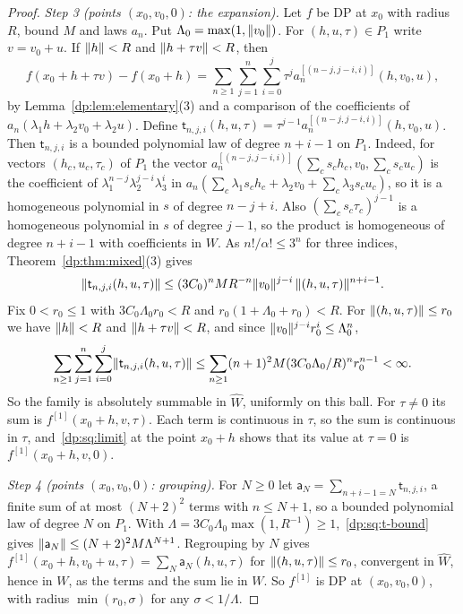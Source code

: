\begin{proof}
\emph{Step 3 (points $(x_0,v_0,0)$: the expansion).} Let $f$ be DP at $x_0$ with radius $R$, bound $M$ and laws $a_n$. Put $\Lambda_0=\max(1,\lVert v_0\rVert)$. For $(h,u,\tau)\in P_1$ write $v=v_0+u$. If $\lVert h\rVert<R$ and $\lVert h+\tau v\rVert<R$, then
\[
 f(x_0+h+\tau v)-f(x_0+h)=\sum_{n\ge1}\sum_{j=1}^n\sum_{i=0}^j\tau^ja_n^{[(n-j,j-i,i)]}(h,v_0,u),
\]
by Lemma~\ref{dp:lem:elementary}(3) and a comparison of the coefficients of $a_n(\lambda_1h+\lambda_2v_0+\lambda_2u)$. Define $\mathsf t_{n,j,i}(h,u,\tau)=\tau^{j-1}a_n^{[(n-j,j-i,i)]}(h,v_0,u)$. Then $\mathsf t_{n,j,i}$ is a bounded polynomial law of degree $n+i-1$ on $P_1$. Indeed, for vectors $(h_c,u_c,\tau_c)$ of $P_1$ the vector $a_n^{[(n-j,j-i,i)]}(\sum_cs_ch_c,v_0,\sum_cs_cu_c)$ is the coefficient of $\lambda_1^{n-j}\lambda_2^{j-i}\lambda_3^i$ in $a_n(\sum_c\lambda_1s_ch_c+\lambda_2v_0+\sum_c\lambda_3s_cu_c)$, so it is a homogeneous polynomial in $s$ of degree $n-j+i$. Also $(\sum_cs_c\tau_c)^{j-1}$ is a homogeneous polynomial in $s$ of degree $j-1$, so the product is homogeneous of degree $n+i-1$ with coefficients in $W$. As $n!/\alpha!\le3^n$ for three indices, Theorem~\ref{dp:thm:mixed}(3) gives
\begin{equation}\label{dp:sq:t-bound}
 \lVert \mathsf t_{n,j,i}(h,u,\tau)\rVert\le(3C_0)^nMR^{-n}\lVert v_0\rVert^{j-i}\,\lVert (h,u,\tau)\rVert^{n+i-1}.
\end{equation}
Fix $0<r_0\le1$ with $3C_0\Lambda_0r_0<R$ and $r_0(1+\Lambda_0+r_0)<R$. For $\lVert (h,u,\tau)\rVert\le r_0$ we have $\lVert h\rVert<R$ and $\lVert h+\tau v\rVert<R$, and since $\lVert v_0\rVert^{j-i}r_0^i\le\Lambda_0^n$,
\[
 \sum_{n\ge1}\sum_{j=1}^n\sum_{i=0}^j\lVert \mathsf t_{n,j,i}(h,u,\tau)\rVert\le\sum_{n\ge1}(n+1)^2M(3C_0\Lambda_0/R)^nr_0^{n-1}<\infty.
\]
So the family is absolutely summable in $\widehat W$, uniformly on this ball. For $\tau\ne0$ its sum is $f^{[1]}(x_0+h,v,\tau)$. Each term is continuous in $\tau$, so the sum is continuous in $\tau$, and~\eqref{dp:sq:limit} at the point $x_0+h$ shows that its value at $\tau=0$ is $f^{[1]}(x_0+h,v,0)$.

\emph{Step 4 (points $(x_0,v_0,0)$: grouping).} For $N\ge0$ let $\mathsf a_N=\sum_{n+i-1=N}\mathsf t_{n,j,i}$, a finite sum of at most $(N+2)^2$ terms with $n\le N+1$, so a bounded polynomial law of degree $N$ on $P_1$. With $\Lambda=3C_0\Lambda_0\max(1,R^{-1})\ge1$,~\eqref{dp:sq:t-bound} gives $\lVert \mathsf a_N\rVert\le(N+2)^2M\Lambda^{N+1}$. Regrouping by $N$ gives $f^{[1]}(x_0+h,v_0+u,\tau)=\sum_N\mathsf a_N(h,u,\tau)$ for $\lVert (h,u,\tau)\rVert\le r_0$, convergent in $\widehat W$, hence in $W$, as the terms and the sum lie in $W$. So $f^{[1]}$ is DP at $(x_0,v_0,0)$, with radius $\min(r_0,\sigma)$ for any $\sigma<1/\Lambda$.


\end{proof}
